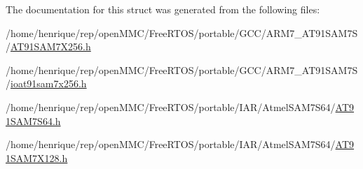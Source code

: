 The documentation for this struct was generated from the following files\-:\begin{DoxyCompactItemize}
\item 
/home/henrique/rep/open\-M\-M\-C/\-Free\-R\-T\-O\-S/portable/\-G\-C\-C/\-A\-R\-M7\-\_\-\-A\-T91\-S\-A\-M7\-S/\hyperlink{GCC_2ARM7__AT91SAM7S_2AT91SAM7X256_8h}{A\-T91\-S\-A\-M7\-X256.\-h}\item 
/home/henrique/rep/open\-M\-M\-C/\-Free\-R\-T\-O\-S/portable/\-G\-C\-C/\-A\-R\-M7\-\_\-\-A\-T91\-S\-A\-M7\-S/\hyperlink{ioat91sam7x256_8h}{ioat91sam7x256.\-h}\item 
/home/henrique/rep/open\-M\-M\-C/\-Free\-R\-T\-O\-S/portable/\-I\-A\-R/\-Atmel\-S\-A\-M7\-S64/\hyperlink{AT91SAM7S64_8h}{A\-T91\-S\-A\-M7\-S64.\-h}\item 
/home/henrique/rep/open\-M\-M\-C/\-Free\-R\-T\-O\-S/portable/\-I\-A\-R/\-Atmel\-S\-A\-M7\-S64/\hyperlink{AT91SAM7X128_8h}{A\-T91\-S\-A\-M7\-X128.\-h}\end{DoxyCompactItemize}
